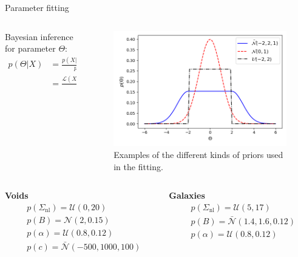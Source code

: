 \documentclass{beamer}
\begin{document}
\begin{frame}[allowframebreaks]{Parameter fitting}
\begin{columns}
	\begin{column}{0.49\linewidth}
		Bayesian inference for parameter $\Theta$: 
		\begin{equation}
		\begin{split}
		p(\Theta|X) &= \frac{p(X|\Theta)p(\Theta)}{p(X)} \\&= \frac{\mathcal{L}(X|\Theta)p(\Theta)}{\mathcal{Z}},
		\end{split}
		\label{eq:bayes}
		\end{equation}
	\end{column}
	\begin{column}{0.49\linewidth}
		\begin{figure}
			\centering
			\includegraphics[width=1\linewidth]{plots/priors}
			\caption{Examples of the different kinds of priors used in the fitting.}
			\label{fig:priors}
		\end{figure}

	\end{column}
\end{columns}
\pagebreak
\begin{columns}
	\begin{column}{0.49\linewidth}
		\textbf{Voids}
		\begin{align}
		&p(\Sigma_{\mathrm{nl}}) = \mathcal{U}(0, 20)\\
		&p(B) = \mathcal{N}(2, 0.15)\\
		&p(\alpha)=\mathcal{U}(0.8, 0.12)\\
		&p(c) = \bar{\mathcal{N}}(-500, 1000, 100)
		\end{align}
	\end{column}
	\begin{column}{0.49\linewidth}
		\textbf{Galaxies}
		\begin{align}
		&p(\Sigma_{\mathrm{nl}}) = \mathcal{U}(5, 17)\\
		&p(B) = \bar{\mathcal{N}}(1.4, 1.6, 0.12)\\
		&p(\alpha)=\mathcal{U}(0.8, 0.12)
		\end{align}
	\end{column}
\end{columns}
\end{frame}
\end{document}
